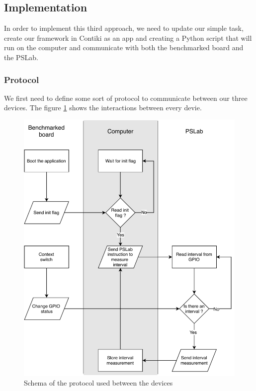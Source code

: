 \subsection{Implementation}

In order to implement this third approach, we need to update our simple task, create our framework in Contiki as an app and creating a Python script that will run on the computer and communicate with both the benchmarked board and the PSLab.

\subsubsection{Protocol}

We first need to define some sort of protocol to communicate between our three devices.
The figure \ref{fig:external-protocol} shows the interactions between every devie.

\begin{figure}[!ht]
  \centering
  \includegraphics[scale=0.7]{assets/external-protocol.pdf}
  \caption{\label{fig:external-protocol}Schema of the protocol used between the devices}
\end{figure}

